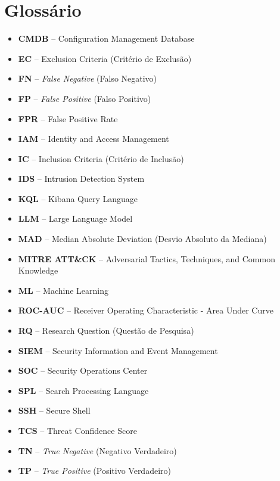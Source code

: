 \documentclass[12pt,a4paper]{article}
\begin{document}
\vspace{1.5cm}

\renewcommand{\listtablename}{Índice de Tabelas}
\listoftables

\newpage

\section*{Glossário}
\begin{itemize}
    \item \textbf{CMDB} -- Configuration Management Database
    \item \textbf{EC} -- Exclusion Criteria (Critério de Exclusão)
    \item \textbf{FN} -- \textit{False Negative} (Falso Negativo)
    \item \textbf{FP} -- \textit{False Positive} (Falso Positivo)
    \item \textbf{FPR} -- False Positive Rate
    \item \textbf{IAM} -- Identity and Access Management
    \item \textbf{IC} -- Inclusion Criteria (Critério de Inclusão)
    \item \textbf{IDS} -- Intrusion Detection System
    \item \textbf{KQL} -- Kibana Query Language
    \item \textbf{LLM} -- Large Language Model
    \item \textbf{MAD} -- Median Absolute Deviation (Desvio Absoluto da Mediana)
    \item \textbf{MITRE ATT\&CK} -- Adversarial Tactics, Techniques, and Common Knowledge
    \item \textbf{ML} -- Machine Learning
    \item \textbf{ROC-AUC} -- Receiver Operating Characteristic - Area Under Curve
    \item \textbf{RQ} -- Research Question (Questão de Pesquisa)
    \item \textbf{SIEM} -- Security Information and Event Management
    \item \textbf{SOC} -- Security Operations Center
    \item \textbf{SPL} -- Search Processing Language
    \item \textbf{SSH} -- Secure Shell
    \item \textbf{TCS} -- Threat Confidence Score
    \item \textbf{TN} -- \textit{True Negative} (Negativo Verdadeiro)
    \item \textbf{TP} -- \textit{True Positive} (Positivo Verdadeiro)
\end{itemize}
\end{document}
